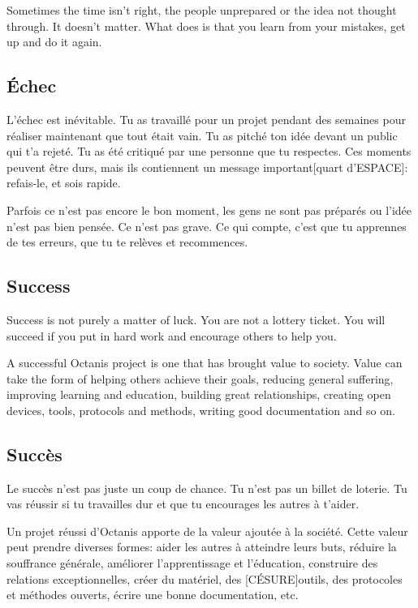 	Sometimes the time isn't right, the people unprepared or the idea not thought through. It doesn't matter. What does is that you learn from your mistakes, get up and do it again. 



\french
	\subsection{Échec}
	L'échec est inévitable. Tu as travaillé pour un projet pendant des semaines pour réaliser maintenant que tout était vain. Tu as pitché ton idée devant un public qui t'a rejeté. Tu as été critiqué par une personne que tu respectes. 
	Ces moments peuvent être durs, mais ils contiennent un message important[quart d'ESPACE]: refais-le, et sois rapide.

	Parfois ce n'est pas encore le bon moment, les gens ne sont pas préparés ou l'idée n'est pas bien pensée. Ce n'est pas grave. Ce qui compte, c'est que tu apprennes de tes erreurs, que tu te relèves et recommences. 

\english
	\subsection{Success}
	
	Success is not purely a matter of luck. You are not a lottery ticket. You will succeed if you put in hard work and encourage others to help you. 


	A successful Octanis project is one that has brought value to society. Value can take the form of helping others achieve their goals, reducing general suffering, improving learning and education, building great relationships, creating open devices, tools, protocols and methods, writing good documentation and so on.


\french
	\subsection{Succès}
	Le succès n'est pas juste un coup de chance. Tu n'est pas un billet de loterie. Tu vas réussir si tu travailles dur et que tu encourages les autres à t'aider. 

	Un projet réussi d'Octanis apporte de la valeur ajoutée à la société. Cette valeur peut prendre diverses formes: aider les autres à atteindre leurs buts, réduire la souffrance générale, améliorer l'apprentissage et l'éducation, construire des relations exceptionnelles, créer du matériel, des [CÉSURE]outils, des protocoles et méthodes ouverts, écrire une bonne documentation, etc. 


